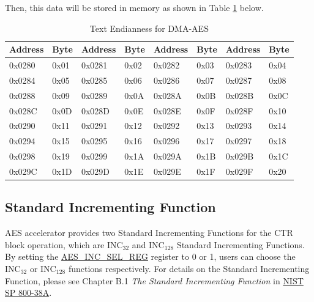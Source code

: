 \documentclass[main\_\_EN.tex]{subfiles}
\begin{document}
Then, this data will be stored in memory as shown in Table \ref{tab:aes-dma-aes-plaintext-ciphertext-endian} below. 

\begin{longtable}[c]
{ | l | l |l | l | l | l | l | l |}
\caption{Text Endianness for DMA-AES} 
\label{tab:aes-dma-aes-plaintext-ciphertext-endian}\\
\hline 
\rowcolor{lightgray}
\textbf{Address} &  \textbf{Byte}  & \textbf{Address} &  \textbf{Byte}  & \textbf{Address} &  \textbf{Byte}  & \textbf{Address} &  \textbf{Byte} \\\hline
0x0280 & 0x01 & 0x0281 & 0x02 & 0x0282 & 0x03 & 0x0283 & 0x04 \\\hline 
0x0284 & 0x05 & 0x0285 & 0x06 & 0x0286 & 0x07 & 0x0287 & 0x08 \\\hline 
0x0288 & 0x09 & 0x0289 & 0x0A & 0x028A & 0x0B & 0x028B & 0x0C \\\hline 
0x028C & 0x0D & 0x028D & 0x0E & 0x028E & 0x0F & 0x028F & 0x10 \\\hline 
0x0290 & 0x11 & 0x0291 & 0x12 & 0x0292 & 0x13 & 0x0293 & 0x14 \\\hline 
0x0294 & 0x15 & 0x0295 & 0x16 & 0x0296 & 0x17 & 0x0297 & 0x18 \\\hline 
0x0298 & 0x19 & 0x0299 & 0x1A & 0x029A & 0x1B & 0x029B & 0x1C \\\hline 
0x029C & 0x1D & 0x029D & 0x1E & 0x029E & 0x1F & 0x029F & 0x20 \\\hline  
\end{longtable}
\subsection{Standard Incrementing Function}\label{sec:aes-Standard-Incrementing-Function}

AES accelerator provides two Standard Incrementing Functions for the CTR block operation, which are INC$_{32}$ and INC$_{128}$ Standard Incrementing Functions. By setting the  \hyperref[regdesc:AESINCSELREG]{AES\_INC\_SEL\_REG} register to 0 or 1, users can choose the INC$_{32}$ or INC$_{128}$ functions respectively. For details on the Standard Incrementing Function, please see Chapter B.1 \textit{The Standard Incrementing Function} in \href{https://nvlpubs.nist.gov/nistpubs/Legacy/SP/nistspecialpublication800-38a.pdf}{NIST SP 800-38A}.
\end{document}
